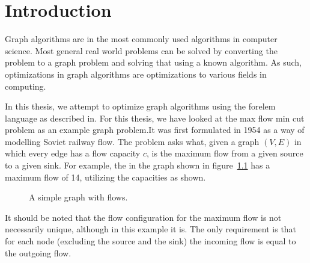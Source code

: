 \chapter{Introduction}

Graph algorithms are in the most commonly used algorithms in computer science. Most general real world problems can be solved by converting the problem to a graph problem and solving that using a known algorithm. As such, optimizations in graph algorithms are optimizations to various fields in computing.

In this thesis, we attempt to optimize graph algorithms using the forelem language as described in\cite{Rietveld}. For this thesis, we have looked at the max flow min cut problem as an example graph problem.It was first formulated in 1954 as a way of modelling Soviet railway flow\cite{HarrisRoss}. The problem asks what, given a graph $(V,E)$ in which every edge has a flow capacity $c$, is the maximum flow from a given source to a given sink. For example, the in the graph shown in figure~\ref{fig:simple-graph} has a maximum flow of 14, utilizing the capacities as shown.

\begin{figure}[h]
\centering
{}
\caption{A simple graph with flows.}
\label{fig:simple-graph}
\end{figure}

It should be noted that the flow configuration for the maximum flow is not necessarily unique, although in this example it is. The only requirement is that for each node (excluding the source and the sink) the incoming flow is equal to the outgoing flow.

